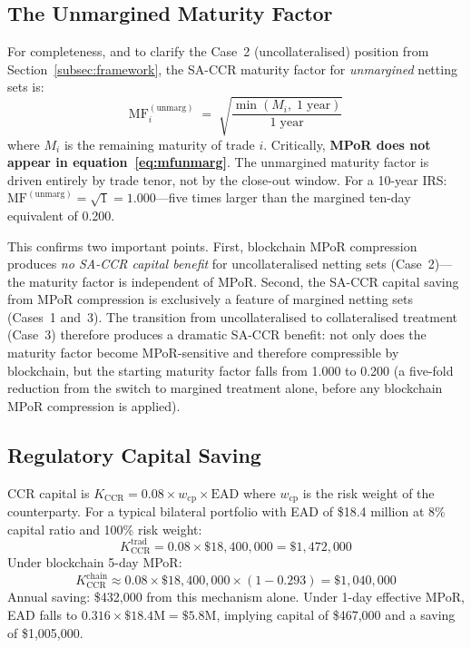 \documentclass[12pt,letterpaper]{article}
\numberwithin{equation}{section}
\theoremstyle{remark}
\newcommand{\MF}{\mathrm{MF}}
\newcommand{\EAD}{\mathrm{EAD}}
\begin{document}
\subsection{The Unmargined Maturity Factor}
\label{subsec:unmargined}

For completeness, and to clarify the Case~2 (uncollateralised) position
from Section~\ref{subsec:framework}, the SA-CCR maturity factor for
\emph{unmargined} netting sets is:
\begin{equation}
  \MF_i^{(\mathrm{unmarg})} \;=\;
  \sqrt{\frac{\min(M_i,\; 1\;\mathrm{year})}{1\;\mathrm{year}}}
  \label{eq:mfunmarg}
\end{equation}
where $M_i$ is the remaining maturity of trade $i$. Critically,
\textbf{MPoR does not appear in equation~\eqref{eq:mfunmarg}}.
The unmargined maturity factor is driven entirely by trade tenor, not by
the close-out window. For a 10-year IRS:
$\MF^{(\mathrm{unmarg})} = \sqrt{1} = 1.000$---five times larger than the
margined ten-day equivalent of 0.200.

This confirms two important points. First, blockchain MPoR compression
produces \emph{no SA-CCR capital benefit} for uncollateralised netting sets
(Case~2)---the maturity factor is independent of MPoR. Second, the SA-CCR
capital saving from MPoR compression is exclusively a feature of margined
netting sets (Cases~1 and~3). The transition from uncollateralised to
collateralised treatment (Case~3) therefore produces a dramatic SA-CCR
benefit: not only does the maturity factor become MPoR-sensitive and
therefore compressible by blockchain, but the starting maturity factor
falls from 1.000 to 0.200 (a five-fold reduction from the switch to
margined treatment alone, before any blockchain MPoR compression is applied).

\subsection{Regulatory Capital Saving}

CCR capital is $K_{\mathrm{CCR}} = 0.08\times w_{\mathrm{cp}} \times \EAD$
where $w_{\mathrm{cp}}$ is the risk weight of the counterparty. For a
typical bilateral portfolio with EAD of \$18.4 million at 8\% capital
ratio and 100\% risk weight:
\begin{equation}
  K_{\mathrm{CCR}}^{\mathrm{trad}} = 0.08 \times \$18{,}400{,}000
  = \$1{,}472{,}000
  \label{eq:capccr}
\end{equation}
Under blockchain 5-day MPoR:
\begin{equation}
  K_{\mathrm{CCR}}^{\mathrm{chain}} \approx
  0.08 \times \$18{,}400{,}000 \times (1 - 0.293)
  = \$1{,}040{,}000
  \label{eq:capccrchain}
\end{equation}
Annual saving: \$432,000 from this mechanism alone. Under 1-day effective
MPoR, EAD falls to $0.316 \times \$18.4\mathrm{M} = \$5.8\mathrm{M}$,
implying capital of \$467,000 and a saving of \$1,005,000.
\end{document}
